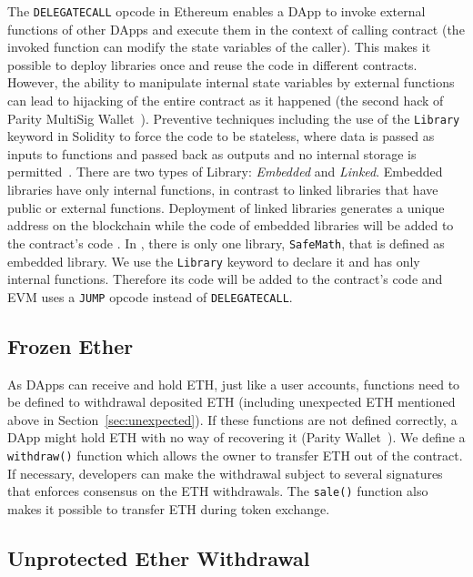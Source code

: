 The \texttt{DELEGATECALL} opcode in Ethereum enables a DApp to invoke external functions of other DApps and execute them in the context of calling contract (\ie the invoked function can modify the state variables of the caller). This makes it possible to deploy libraries once and reuse the code in different contracts. However, the ability to manipulate internal state variables by external functions can lead to hijacking of the entire contract as it happened (\cf the second hack of Parity MultiSig Wallet~\cite{ParitySecondHack}). Preventive techniques including the use of the \texttt{Library} keyword in Solidity to force the code to be stateless, where data is passed as inputs to functions and passed back as outputs and no internal storage is permitted~\cite{LIB1}. There are two types of Library: \textit{Embedded} and \textit{Linked}. Embedded libraries have only internal functions, in contrast to linked libraries that have public or external functions. Deployment of linked libraries generates a unique address on the blockchain while the code of embedded libraries will be added to the contract's code \cite{LIB2}. In \sys, there is only one library, \texttt{SafeMath}, that is defined as embedded library. We use the \texttt{Library} keyword to declare it and has only internal functions. Therefore its code will be added to the \erc contract's code and EVM uses a \texttt{JUMP} opcode instead of \texttt{DELEGATECALL}.

\subsection{Frozen Ether}

As DApps can receive and hold ETH, just like a user accounts, functions need to be defined to withdrawal deposited ETH (including unexpected ETH mentioned above in Section~\ref{sec:unexpected}). If these functions are not defined correctly, a DApp might hold ETH with no way of recovering it (\cf Parity Wallet~\cite{ParityWalletHack}). We define a \texttt{withdraw()} function which allows the owner to transfer ETH out of the contract. {\chg If necessary, developers can make the withdrawal subject to several signatures that enforces consensus on the ETH withdrawals.} The \texttt{sale()} function also makes it possible to transfer ETH during token exchange.

\subsection{Unprotected Ether Withdrawal}

